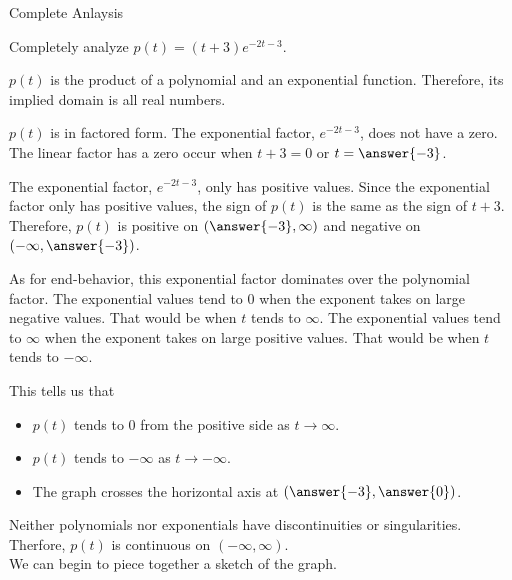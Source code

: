 \documentclass{ximera}
\begin{document}
\begin{example} Complete Anlaysis

Completely analyze $p(t) = (t+3)e^{-2t-3}$.

\begin{explanation}


$p(t)$ is the product of a polynomial and an exponential function. Therefore, its implied domain is all real numbers.

$p(t)$ is in factored form.  The exponential factor, $e^{-2t-3}$, does not have a zero.  The linear factor has a zero occur when $t+3=0$ or $t=\answer{-3}$.  

The exponential factor, $e^{-2t-3}$, only has positive values.   Since the exponential factor only has positive values, the sign of $p(t)$ is the same as the sign of $t+3$.  Therefore, $p(t)$ is positive on $\left( \answer{-3}, \infty \right)$ and negative on $\left( -\infty, \answer{-3} \right)$.  





As for end-behavior, this exponential factor dominates over the polynomial factor.  The exponential values tend to $0$ when the exponent takes on large negative values.  That would be when $t$ tends to $\infty$. The exponential values tend to $\infty$ when the exponent takes on large positive values.  That would be when $t$ tends to $-\infty$.  




This tells us that 

\begin{itemize}
\item $p(t)$ tends to $0$ from the positive side as $t \to \infty$.
\item $p(t)$ tends to $-\infty$ as $t \to -\infty$.
\item The graph crosses the horizontal axis at $\left( \answer{-3}, \answer{0} \right)$.
\end{itemize}



Neither polynomials nor exponentials have discontinuities or singularities.  Therfore, $p(t)$ is continuous on $(-\infty, \infty)$. \\






We can begin to piece together a sketch of the graph.







\end{explanation}
\end{example}
\end{document}
